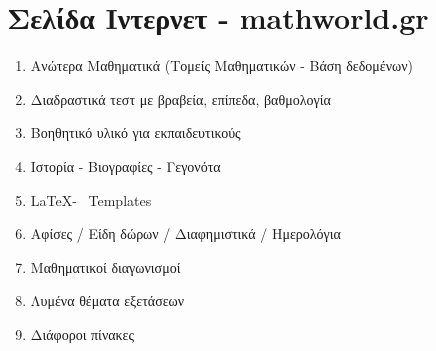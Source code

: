 \documentclass[11pt,a4paper]{article}
\begin{document}
\section{Σελίδα Ιντερνετ - mathworld.gr}
\begin{enumerate}[label=\thesection.\arabic*]
\item Ανώτερα Μαθηματικά (Τομείς Μαθηματικών - Βάση δεδομένων)
\item Διαδραστικά τεστ με βραβεία, επίπεδα, βαθμολογία
\item Βοηθητικό υλικό για εκπαιδευτικούς
\item Ιστορία - Βιογραφίες - Γεγονότα
\item \LaTeX - \XeLaTeX \ Templates
\item Αφίσες / Είδη δώρων / Διαφημιστικά / Ημερολόγια
\item Μαθηματικοί διαγωνισμοί
\item Λυμένα θέματα εξετάσεων
\item Διάφοροι πίνακες
\end{enumerate}
\end{document}
